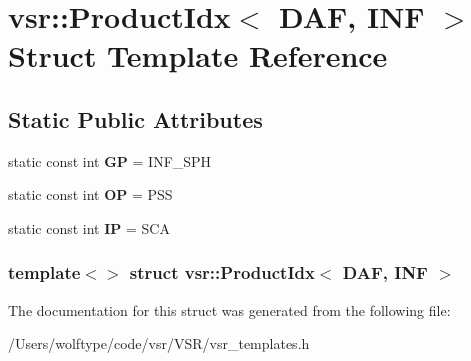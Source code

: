 \hypertarget{structvsr_1_1_product_idx_3_01_d_a_f_00_01_i_n_f_01_4}{\section{vsr\-:\-:Product\-Idx$<$ D\-A\-F, I\-N\-F $>$ Struct Template Reference}
\label{structvsr_1_1_product_idx_3_01_d_a_f_00_01_i_n_f_01_4}
}
\subsection*{Static Public Attributes}
\begin{DoxyCompactItemize}
\item 
\hypertarget{structvsr_1_1_product_idx_3_01_d_a_f_00_01_i_n_f_01_4_ac1e153a70c3f7657ea69fb5463ccb1e8}{static const int {\bfseries G\-P} = I\-N\-F\-\_\-\-S\-P\-H}\label{structvsr_1_1_product_idx_3_01_d_a_f_00_01_i_n_f_01_4_ac1e153a70c3f7657ea69fb5463ccb1e8}

\item 
\hypertarget{structvsr_1_1_product_idx_3_01_d_a_f_00_01_i_n_f_01_4_a0b4718fb31bd655a8d360ee2d4bb2138}{static const int {\bfseries O\-P} = P\-S\-S}\label{structvsr_1_1_product_idx_3_01_d_a_f_00_01_i_n_f_01_4_a0b4718fb31bd655a8d360ee2d4bb2138}

\item 
\hypertarget{structvsr_1_1_product_idx_3_01_d_a_f_00_01_i_n_f_01_4_a9a0675918163a2c169b92fb310146524}{static const int {\bfseries I\-P} = S\-C\-A}\label{structvsr_1_1_product_idx_3_01_d_a_f_00_01_i_n_f_01_4_a9a0675918163a2c169b92fb310146524}

\end{DoxyCompactItemize}
\subsubsection*{template$<$$>$ struct vsr\-::\-Product\-Idx$<$ D\-A\-F, I\-N\-F $>$}



The documentation for this struct was generated from the following file\-:\begin{DoxyCompactItemize}
\item 
/\-Users/wolftype/code/vsr/\-V\-S\-R/vsr\-\_\-templates.\-h\end{DoxyCompactItemize}
